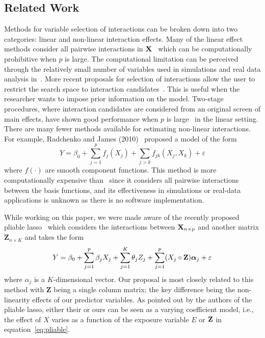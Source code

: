 


\subsection{Related Work}\label{subsec:related_work_sail}
Methods for variable selection of interactions can be broken down into two categories: linear and non-linear interaction effects. 
Many of the linear effect methods consider all pairwise interactions in $\textbf{X}$~\citep{zhao2009composite,choi2010variable,bien2013lasso, she2014group} which can be computationally prohibitive when $p$ is large. The computational limitation can be perceived through the relatively small number of variables used in simulations and real data analysis in~\citep{zhao2009composite,choi2010variable,bien2013lasso, she2014group}. 
More recent proposals for selection of interactions allow the user to restrict the search space to interaction candidates~\citep{lim2015learning,haris2016convex}. This is useful when the researcher wants to impose prior information on the model. 
Two-stage procedures, where interaction candidates are considered from an original screen of main effects, have shown good performance when $p$ is large~\citep{hao2018model,shah2016modelling} in the linear setting.  
There are many fewer methods available for estimating non-linear interactions. For example, Radchenko and James (2010)~\citep{radchenko2010variable} proposed a model of the form
\[Y = \beta_0 + \sum_{j=1}^{p} f_j(X_j) + \sum_{j>k}f_{jk}(X_j, X_k) + \varepsilon\]
where $f(\cdot)$ are smooth component functions. This method is more computationally expensive than \sail ~since it considers all pairwise interactions between the basis functions, and its effectiveness in simulations or real-data applications is unknown as there is no software implementation.  

While working on this paper, we were made aware of the recently proposed pliable lasso~\citep{tibshirani2017pliable} which considers the interactions between $\textbf{X}_{n \times p}$ and another matrix $\mathbf{Z}_{n\times K}$ and takes the form
\begin{equation}
Y = \beta_0 + \sum_{j=1}^{p}\beta_j X_j + \sum_{j=1}^{K}\theta_j Z_j + \sum_{j=1}^{p} (X_j \circ \mathbf{Z}) \boldsymbol{\alpha}_j + \varepsilon \label{eq:pliable}
\end{equation} 
where $\alpha_j$ is a $K$-dimensional vector. 
Our proposal is most closely related to this method with $\mathbf{Z}$ being a single column matrix; the key difference being the non-linearity effects of our predictor variables. 
As pointed out by the authors of the pliable lasso, either their or ours can be seen as a varying coefficient model, i.e., the effect of $X$ varies as a function of the exposure variable $E$ or $\mathbf{Z}$ in equation~\ref{eq:pliable}. 

